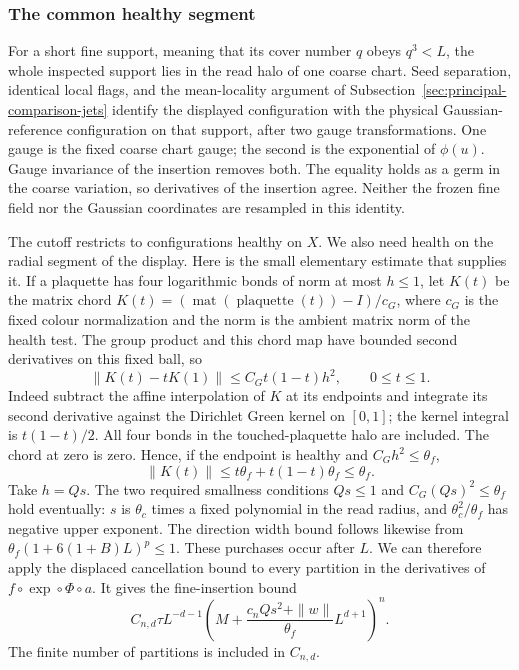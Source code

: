 \subsubsection{The common healthy segment}
For a short fine support, meaning that its cover number $q$ obeys
$q^3<L$, the whole inspected support lies in the read halo of
one coarse chart. Seed separation, identical local flags, and the
mean-locality argument of
Subsection~\ref{sec:principal-comparison-jets} identify the displayed
configuration with the physical Gaussian-reference configuration
on that support, after two gauge transformations. One gauge is
the fixed coarse chart gauge; the second is the exponential of
$\phi(u)$. Gauge invariance of the insertion removes both.
The equality holds as a germ in the coarse variation, so derivatives
of the insertion agree. Neither the frozen fine field nor the
Gaussian coordinates are resampled in this identity.

The cutoff restricts to configurations healthy on $X$. We also
need health on the radial segment of the display. Here is the
small elementary estimate that supplies it. If a plaquette has
four logarithmic bonds of norm at most $h\le1$, let $K(t)$ be
the matrix chord
$K(t)=(\operatorname{mat}(\operatorname{plaquette}(t))-I)/c_G$,
where $c_G$ is the fixed colour normalization and the norm is the
ambient matrix norm of the health test. The group product and
this chord map have bounded second derivatives on this fixed ball,
so
\[
 \|K(t)-tK(1)\|\le C_G t(1-t)h^2,
                                      \qquad 0\le t\le1.
\]
Indeed subtract the affine interpolation of $K$ at its endpoints
and integrate its second derivative against the Dirichlet Green
kernel on $[0,1]$; the kernel integral is $t(1-t)/2$.
All four bonds in the touched-plaquette halo are included. The chord
at zero is zero. Hence, if the endpoint is healthy
and $C_Gh^2\le\theta_f$,
\[
                  \|K(t)\|\le t\theta_f+
                       t(1-t)\theta_f\le\theta_f.
\]
Take $h=Qs$. The two required smallness conditions
$Qs\le1$ and $C_G(Qs)^2\le\theta_f$ hold eventually: $s$ is
$\theta_c$ times a fixed polynomial in the read radius, and
$\theta_c^2/\theta_f$ has negative upper exponent. The direction
width bound follows likewise from
$\theta_f(1+6(1+B)L)^p\le1$. These purchases occur after $L$.
We can therefore apply the displaced cancellation bound to every
partition in the derivatives of $f\circ\exp\circ\Phi\circ a$.
It gives the fine-insertion bound
\begin{equation}\label{eq:reference-short-pointwise}
 C_{n,d}\tau L^{-d-1}
 \left(M+\frac{c_nQs^2+\|w\|}{\theta_f}L^{d+1}\right)^n.
\end{equation}
The finite number of partitions is included in $C_{n,d}$.

